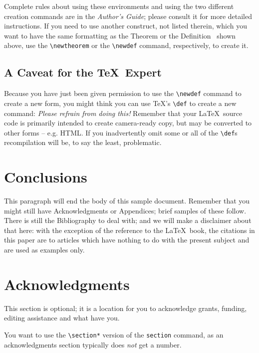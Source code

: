 \documentclass{sig-alternate}
\begin{document}
Complete rules about using these environments and using the
two different creation commands are in the
\textit{Author's Guide}; please consult it for more
detailed instructions.  If you need to use another construct,
not listed therein, which you want to have the same
formatting as the Theorem
or the Definition~\cite{salas:calculus} shown above,
use the \texttt{\textbackslash newtheorem} or the
\texttt{\textbackslash newdef} command,
respectively, to create it.

\subsection*{A {\secit Caveat} for the \TeX\ Expert}
\label{sec:caveatForExperts}

Because you have just been given permission to
use the \texttt{\textbackslash newdef} command to create a
new form, you might think you can
use \TeX's \texttt{\textbackslash def} to create a
new command: \textit{Please refrain from doing this!}
Remember that your \LaTeX\ source code is primarily intended
to create camera-ready copy, but may be converted
to other forms -- e.g. HTML. If you inadvertently omit
some or all of the \texttt{\textbackslash def}s recompilation will
be, to say the least, problematic.

\section{Conclusions}
\label{sec:conclusions}

This paragraph will end the body of this sample document.
Remember that you might still have Acknowledgments or
Appendices; brief samples of these
follow.  There is still the Bibliography to deal with; and
we will make a disclaimer about that here: with the exception
of the reference to the \LaTeX\ book, the citations in
this paper are to articles which have nothing to
do with the present subject and are used as
examples only.

\section*{Acknowledgments}
\label{sec:acknowledgments}

This section is optional; it is a location for you
to acknowledge grants, funding, editing assistance and
what have you.

You want to use the \texttt{\textbackslash section*} version of the \texttt{section}
command, as an acknowledgments section typically does \emph{not} get
a number.
\end{document}
